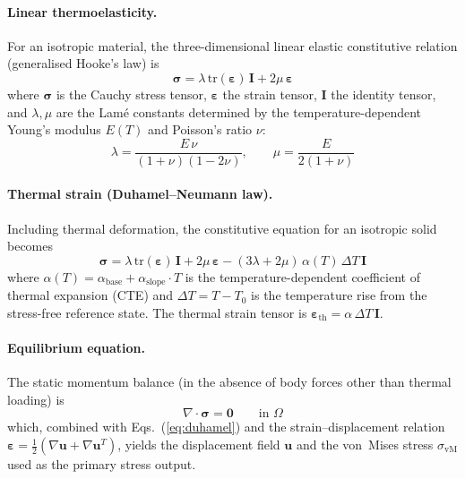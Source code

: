 \documentclass[11pt,a4paper]{article}
\newcommand{\abase}{\ensuremath{\alpha_{\mathrm{base}}}}
\newcommand{\aslope}{\ensuremath{\alpha_{\mathrm{slope}}}}
\begin{document}
\paragraph{Linear thermoelasticity.}
For an isotropic material, the three-dimensional linear elastic
constitutive relation (generalised Hooke's law) is
\begin{equation}
\boldsymbol{\sigma}
= \lambda\,\mathrm{tr}(\boldsymbol{\varepsilon})\,\mathbf{I}
  + 2\mu\,\boldsymbol{\varepsilon}
\label{eq:hooke}
\end{equation}
where $\boldsymbol{\sigma}$ is the Cauchy stress tensor,
$\boldsymbol{\varepsilon}$ the strain tensor, $\mathbf{I}$ the identity
tensor, and $\lambda,\mu$ are the Lam\'{e} constants determined by the
temperature-dependent Young's modulus $E(T)$ and Poisson's ratio $\nu$:
\begin{equation}
\lambda = \frac{E\,\nu}{(1+\nu)(1-2\nu)},
\qquad
\mu = \frac{E}{2(1+\nu)}
\label{eq:lame}
\end{equation}

\paragraph{Thermal strain (Duhamel--Neumann law).}
Including thermal deformation, the constitutive equation for an
isotropic solid becomes
\begin{equation}
\boldsymbol{\sigma}
= \lambda\,\mathrm{tr}(\boldsymbol{\varepsilon})\,\mathbf{I}
  + 2\mu\,\boldsymbol{\varepsilon}
  - (3\lambda + 2\mu)\,\alpha(T)\,\Delta T\,\mathbf{I}
\label{eq:duhamel}
\end{equation}
where $\alpha(T) = \abase{} + \aslope{}\cdot T$ is the
temperature-dependent coefficient of thermal expansion (CTE) and
$\Delta T = T - T_0$ is the temperature rise from the stress-free
reference state. The thermal strain tensor is
$\boldsymbol{\varepsilon}_{\mathrm{th}} = \alpha\,\Delta T\,\mathbf{I}$.

\paragraph{Equilibrium equation.}
The static momentum balance (in the absence of body forces other than
thermal loading) is
\begin{equation}
\nabla \cdot \boldsymbol{\sigma} = \mathbf{0}
\qquad \text{in } \Omega
\end{equation}
which, combined with Eqs.~(\ref{eq:duhamel}) and the strain--displacement
relation
$\boldsymbol{\varepsilon} = \tfrac{1}{2}(\nabla\mathbf{u} +
\nabla\mathbf{u}^T)$, yields the displacement field $\mathbf{u}$ and
the von~Mises stress $\sigma_\mathrm{vM}$ used as the primary stress
output.
\end{document}
